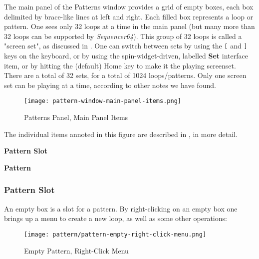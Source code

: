    The main panel of the Patterns window provides a grid of empty boxes,
   each box delimited by brace-like lines at left and right.
   Each filled box represents a loop or pattern.
   One sees only 32 loops at a time in the main panel (but many more than
   32 loops can be supported by \textsl{Sequencer64}).
   This group of 32 loops is called a "screen set", as discussed in
   .
   One can switch between sets by using the
   \index{keys![}
   \texttt{[} and
   \index{keys!]}
   \texttt{]} keys on the keyboard, or by using
   the spin-widget-driven, labelled \textbf{Set} interface item, or
   by hitting the (default) Home key to make it the playing screenset.
   There are a total of 32 sets, for a total of 1024 loops/patterns. 
   Only one screen set can be playing at a time, according to other notes we
   have found.

\begin{figure}[H]
   \centering 
   \texttt{[image: pattern-window-main-panel-items.png]}
   \caption{Patterns Panel, Main Panel Items}
   \label{fig:pattern_window_main_panel_items}
\end{figure}

   The individual items annoted in this figure are described in
   , in more detail.

   \begin{enumber}
      \item \textbf{Pattern Slot}
      \item \textbf{Pattern}
   \end{enumber}

\subsubsection{Pattern Slot}
\label{subsubsec:seq64_patterns_pattern_slot}

   An empty box is a slot for a pattern.
   By right-clicking on an empty box one brings up a menu to create
   a new loop, as well as some other operations:

\begin{figure}[H]
   \centering 
   \texttt{[image: pattern/pattern-empty-right-click-menu.png]}
   \caption{Empty Pattern, Right-Click Menu}
   \label{fig:pattern_window_empty_right_click}
\end{figure}

